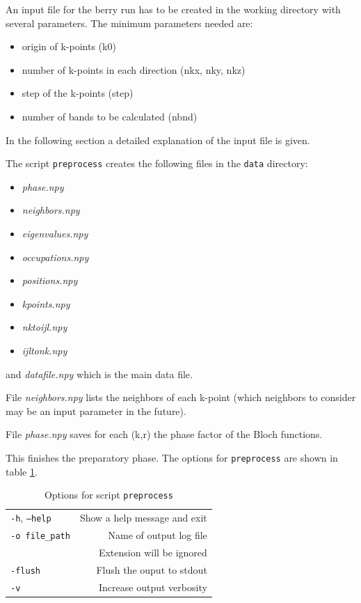 \documentclass[a4paper,12pt]{report}
\begin{document}
 An input file for the berry run has to be created in the working directory with several parameters.
The minimum parameters needed are:
\begin{itemize}
 \item origin of k-points (k0)
 \item number of k-points in each direction (nkx, nky, nkz)
 \item step of the k-points (step)
 \item number of bands to be calculated (nbnd)
\end{itemize}
 In the following section a detailed explanation of the input file is given.

The script \texttt{preprocess} creates the following files in the \verb|data| directory:
\begin{itemize}
 \item \emph{phase.npy}
 \item \emph{neighbors.npy}
 \item \emph{eigenvalues.npy}
 \item \emph{occupations.npy}
 \item \emph{positions.npy}
 \item \emph{kpoints.npy}
 \item \emph{nktoijl.npy}
 \item \emph{ijltonk.npy}
\end{itemize}
and \emph{datafile.npy} which is the main data file.

File \emph{neighbors.npy} lists the neighbors of each k-point
(which neighbors to consider may be an input parameter in the future).

File \emph{phase.npy} saves for each (k,r) the phase factor of the Bloch functions.

This finishes the preparatory phase.
The options for \texttt{preprocess} are shown in table \ref{tab:options_preprocess}.

\begin{table}[h]
 \centering
 \caption{Options for script \texttt{preprocess}}\label{tab:options_preprocess}
\begin{tabular}[]{lr}
\hline
  \texttt{-h}, \texttt{--help}  &\hspace*{2cm} Show a help message and exit \\
  \texttt{-o file\_path}        & Name of output log file\\
                                & Extension will be ignored \\
  \texttt{-flush}               & Flush the ouput to stdout \\
  \texttt{-v}                   & Increase output verbosity \\
  \hline
\end{tabular}
\end{table}
\end{document}
